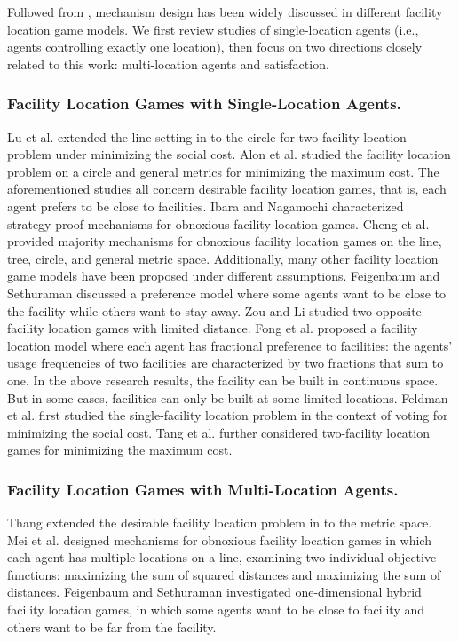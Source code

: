 \documentclass[runningheads]{11llncst}
\begin{document}
Followed from  \cite{procaccia2009approximate}, mechanism design has been widely discussed in different facility location game models. We first review  studies of single-location agents (i.e., agents controlling exactly one location), then focus on two directions closely related to this work: multi-location agents and satisfaction.

\subsubsection{Facility Location Games with Single-Location Agents.}  Lu et al.  \cite{lu2010asymptotically} extended the line setting in \cite{procaccia2009approximate} to the circle for two-facility location problem under minimizing the social cost.  Alon et al.  \cite{alon2010strategyproof} studied the  facility location problem on a circle and general metrics for minimizing the maximum cost. The aforementioned studies all concern desirable  facility location games, that is, each agent prefers to be close to facilities. Ibara and Nagamochi \cite{ibara2012characterizing} characterized  strategy-proof mechanisms for  obnoxious facility location games. Cheng et al. \cite{cheng2013strategy} provided majority mechanisms for obnoxious facility location games  on the line, tree, circle, and general metric space.  Additionally, many other  facility location game models have been proposed under different assumptions. Feigenbaum and Sethuraman  \cite{feigenbaum2014strategyproof} discussed a preference model  where some agents want to be close to the facility while others  want to stay away. Zou and Li \cite{zou2015facility} studied two-opposite-facility location games with limited distance. Fong et al.  \cite{fong2018facility} proposed a facility location model where each agent has fractional preference to facilities: the agents' usage frequencies of two facilities are characterized by two fractions that sum to one. In the above research results, the facility can be built in continuous space. But in some cases, facilities can only be built at some limited locations. Feldman et al. \cite{feldman2016voting} first studied the single-facility location problem  in the context of voting for minimizing the social cost. Tang et al. \cite{tang2020mechanism} further considered  two-facility location games for minimizing the maximum cost. 


\subsubsection{Facility Location Games with Multi-Location Agents.}  Thang \cite{thang2010group} extended the desirable facility location problem in \cite{procaccia2009approximate} to the metric space. Mei et al.  \cite{mei2018approximation} designed mechanisms for obnoxious facility location games in which each agent has multiple locations on a line, examining two individual objective functions: maximizing the sum of squared distances and maximizing the sum of distances. Feigenbaum and Sethuraman  \cite{feigenbaum2014strategyproof} investigated one-dimensional hybrid facility location games, in which some agents want to be close to facility and  others want to be far from the facility.
\end{document}
